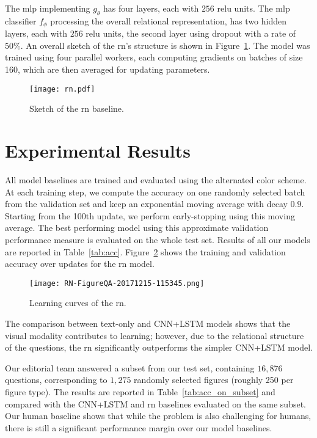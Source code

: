 \documentclass{article} \usepackage{iclr2018_workshop,times}
\begin{document}
The \gls{mlp} implementing $g_\theta$ has four layers, each with $256$ \gls{relu} units. The \gls{mlp} classifier $f_\phi$ processing the overall relational representation, has two hidden layers, each with $256$ \gls{relu} units, the second layer using dropout with a rate of $50\%$.
An overall sketch of the \gls{rn}'s structure is shown in Figure~\ref{fig:rn}. The model was trained using four parallel workers, each computing gradients on batches of size 160, which are then averaged for updating parameters.

\begin{figure}[h]
    \centering
    \texttt{[image: rn.pdf]}
    \caption{Sketch of the \gls{rn} baseline.}
    \label{fig:rn}
\end{figure}

\FloatBarrier

\section{Experimental Results}
All model baselines are trained and evaluated using the alternated color scheme.
At each training step, we compute the accuracy on one randomly selected batch from the validation set and keep an exponential moving average with decay $0.9$.
Starting from the 100th update, we perform early-stopping using this moving average.
The best performing model using this approximate validation performance measure is evaluated on the whole test set. Results of all our models are reported in Table~\ref{tab:acc}.
Figure~\ref{fig:rn_learning_curve} shows the training and validation accuracy over updates for the \gls{rn} model.
\begin{figure}[h]
    \centering
    \texttt{[image: RN-FigureQA-20171215-115345.png]}
    \caption{Learning curves of the \gls{rn}.}
    \label{fig:rn_learning_curve}
\end{figure}

The comparison between text-only and CNN+LSTM models shows that the visual modality contributes to learning; however, due to the relational structure of the questions, the \gls{rn} significantly outperforms the simpler CNN+LSTM model.

Our editorial team answered a subset from our test set, containing $16,876$ questions, corresponding to $1,275$ randomly selected figures (roughly 250 per figure type).
The results are reported in Table~\ref{tab:acc_on_subset} and compared with the CNN+LSTM and \gls{rn} baselines evaluated on the same subset.
Our human baseline shows that while the problem is also challenging for humans, there is still a significant performance margin over our model baselines.
\end{document}

